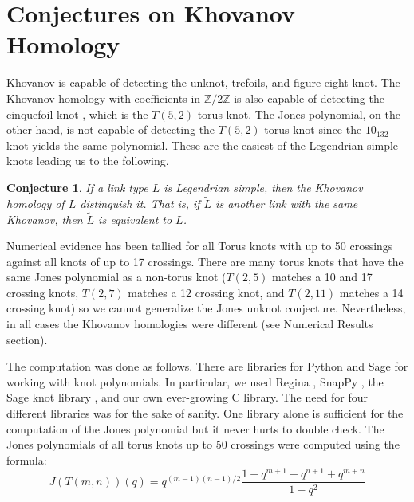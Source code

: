 \documentclass{article}
\theoremstyle{plain}
\newtheorem{conjecture}{Conjecture}
\begin{document}
    \section{Conjectures on Khovanov Homology}
        Khovanov is capable of detecting the
        unknot, trefoils, and figure-eight knot. The Khovanov homology with
        coefficients in $\mathbb{Z}/2\mathbb{Z}$ is also capable of detecting
        the cinquefoil knot \cite{BaldwinYingSivekCinquefoilKhovanov},
        which is the $T(5,2)$ torus knot. The Jones
        polynomial, on the other hand, is not capable of detecting the
        $T(5,2)$ torus knot since the $10_{132}$ knot yields the same
        polynomial. These are the easiest of the Legendrian simple knots
        leading us to the following.
        \begin{conjecture}
            If a link type $L$ is Legendrian simple, then the Khovanov homology
            of $L$ distinguish it. That is, if $\tilde{L}$
            is another link with the same Khovanov, then $\tilde{L}$ is
            equivalent to $L$.
        \end{conjecture}
        Numerical evidence has been tallied for all Torus knots with up to 50
        crossings against all knots of up to 17 crossings. There are many
        torus knots that have the same Jones polynomial as a non-torus knot
        ($T(2,5)$ matches a 10 and 17 crossing knots, $T(2,7)$
        matches a 12 crossing knot, and $T(2,11)$ matches a 14 crossing knot)
        so we cannot generalize the Jones unknot conjecture. Nevertheless, in
        all cases the Khovanov homologies were different
        (see Numerical Results section).
        \par\hfill\par
        The computation was done as follows. There are libraries for Python and
        Sage for working with knot polynomials. In particular, we used
        Regina \cite{regina}, SnapPy \cite{SnapPy}, the Sage knot library
        \cite{sage}, and our own ever-growing C library. The need for four
        different libraries was for the sake of sanity. One library alone is
        sufficient for the computation of the Jones polynomial but it never
        hurts to double check. The Jones polynomials of all torus knots up to
        50 crossings were computed using the formula:
        \begin{equation}
            \label{eqn:jones_poly_torus}%
            J(T(m,n))(q)=q^{(m-1)(n-1)/2}
                \frac{1-q^{m+1}-q^{n+1}+q^{m+n}}{1-q^{2}}
        \end{equation}
\end{document}
